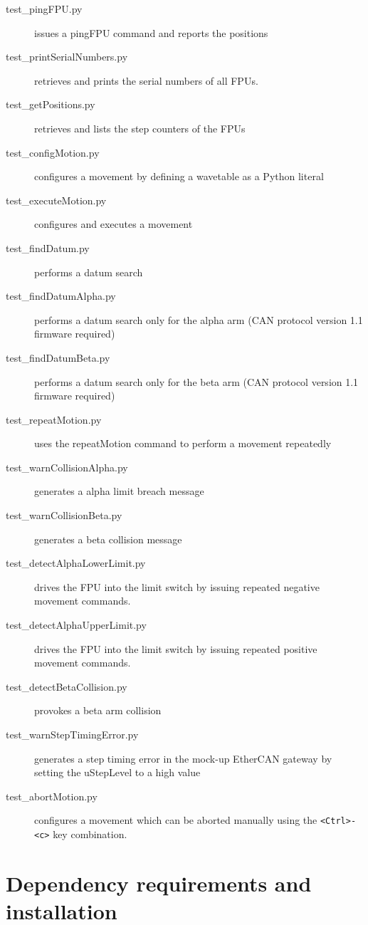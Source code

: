 \documentclass[11pt,a4paper]{report}
\begin{document}
\begin{description}
\item[test\_pingFPU.py] issues a pingFPU command and reports the positions
\item[test\_printSerialNumbers.py] retrieves and prints the serial numbers of all FPUs.
\item[test\_getPositions.py] retrieves and lists the step counters of the FPUs
\item[test\_configMotion.py] configures a movement by defining a wavetable as a Python literal
\item[test\_executeMotion.py] configures and executes a movement
\item[test\_findDatum.py] performs a datum search
\item[test\_findDatumAlpha.py] performs a datum search only for the alpha arm (CAN protocol version 1.1 firmware required)
\item[test\_findDatumBeta.py] performs a datum search only for the beta arm (CAN protocol version 1.1 firmware required)
\item[test\_repeatMotion.py] uses the repeatMotion command to perform a movement repeatedly
\item[test\_warnCollisionAlpha.py] generates a alpha limit breach message
\item[test\_warnCollisionBeta.py] generates a beta collision message
\item[test\_detectAlphaLowerLimit.py] drives the FPU into the limit switch by issuing repeated negative movement commands.
\item[test\_detectAlphaUpperLimit.py] drives the FPU into the limit switch by issuing repeated positive movement commands.
\item[test\_detectBetaCollision.py] provokes a beta arm collision
\item[test\_warnStepTimingError.py] generates a step timing error
  in the mock-up EtherCAN gateway by setting the uStepLevel to a high
  value  
\item[test\_abortMotion.py]  configures a movement which can be aborted
  manually using the \verb+<Ctrl>-<c>+ key combination.
\end{description}

\section{Dependency requirements and installation}
\label{sec:installationfromscratch}
\end{document}
